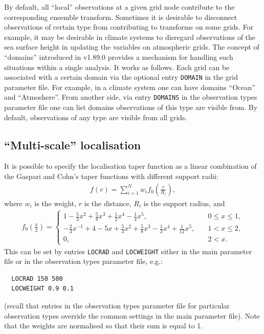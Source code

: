 \documentclass[11pt]{report}
\begin{document}
By default, all ``local'' observations at a given grid node contribute to the corresponding ensemble transform.
Sometimes it is desirable to disconnect observations of certain type from contributing to transforms on some grids.
For example, it may be desirable in climate systems to disregard observations of the sea surface height in updating the variables on atmospheric grids.
The concept of ``domains'' introduced in v1.89.0 provides a mechanism for handling such situations within a single analysis.
It works as follows.
Each grid can be associated with a certain domain via the optional entry \verb|DOMAIN| in the grid parameter file.
For example, in a climate system one can have domains ``Ocean'' and ``Atmoshere''.
From another side, via entry \verb|DOMAINS| in the observation types parameter file one can list domains observations of this type are visible from.
By default, observations of any type are visible from all grids.

\subsection {``Multi-scale'' localisation}

It is possible to specify the localisation taper function as a linear combination of the Gaspari and Cohn's taper functions with different support radii:
\begin{align*}
  f(r) = \sum_{i=1}^N w_i f_0(\frac{r}{R_i}),
\end{align*}
where $w_i$ is the weight, $r$ is the distance, $R_i$ is the support radius, and
\begin{align*}
  f_0(\frac{x}{2}) = \left\{
  \begin{array}{ll}
    1 - \frac{5}{3} x^2 + \frac{5}{8} x^3 + \frac{1}{2} x^4 -\frac{1}{4} x^5, \quad & 0 \le x \le 1,\\
    -\frac{2}{3} x^{-1} + 4 - 5x + \frac{5}{3}x^2 + \frac{5}{8}x^3 - \frac{1}{2} x^4 + \frac{1}{12}x^5, \quad & 1 < x \le 2,\\
    0, \quad & 2 < x.
  \end{array}
  \right.
\end{align*}
This can be set by entries \verb|LOCRAD| and \verb|LOCWEIGHT| either in the main parameter file or in the observation types parameter file, e.g.:
\begin{Verbatim}
  LOCRAD 150 500
  LOCWEIGHT 0.9 0.1
\end{Verbatim}
(recall that entries in the observation types parameter file for particular observation types override the common settings in the main parameter file).
Note that the weights are normalised so that their sum is equal to 1.
\end{document}
